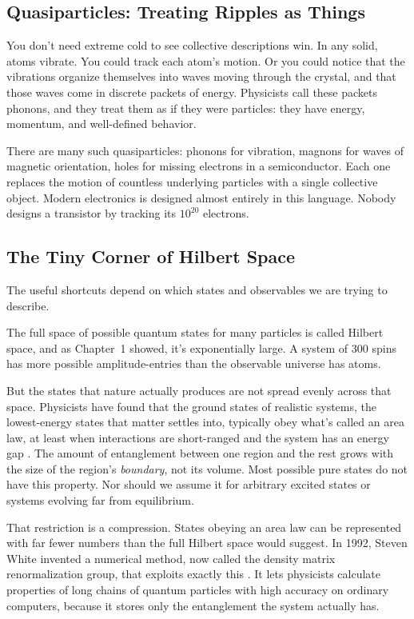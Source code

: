 \subsection{Quasiparticles: Treating Ripples as Things}

You don't need extreme cold to see collective descriptions win. In any solid, atoms vibrate. You could track each atom's motion. Or you could notice that the vibrations organize themselves into waves moving through the crystal, and that those waves come in discrete packets of energy. Physicists call these packets phonons, and they treat them as if they were particles: they have energy, momentum, and well-defined behavior.

There are many such quasiparticles: phonons for vibration, magnons for waves of magnetic orientation, holes for missing electrons in a semiconductor. Each one replaces the motion of countless underlying particles with a single collective object. Modern electronics is designed almost entirely in this language. Nobody designs a transistor by tracking its \(10^{20}\) electrons.

\subsection{The Tiny Corner of Hilbert Space}

The useful shortcuts depend on which states and observables we are trying to describe.

The full space of possible quantum states for many particles is called Hilbert space, and as Chapter~1 showed, it's exponentially large. A system of 300 spins has more possible amplitude-entries than the observable universe has atoms.

But the states that nature actually produces are not spread evenly across that space. Physicists have found that the ground states of realistic systems, the lowest-energy states that matter settles into, typically obey what's called an area law, at least when interactions are short-ranged and the system has an energy gap \cite{eisert2010}. The amount of entanglement between one region and the rest grows with the size of the region's \emph{boundary}, not its volume. Most possible pure states do not have this property. Nor should we assume it for arbitrary excited states or systems evolving far from equilibrium.

That restriction is a compression. States obeying an area law can be represented with far fewer numbers than the full Hilbert space would suggest. In 1992, Steven White invented a numerical method, now called the density matrix renormalization group, that exploits exactly this \cite{white1992}. It lets physicists calculate properties of long chains of quantum particles with high accuracy on ordinary computers, because it stores only the entanglement the system actually has.

